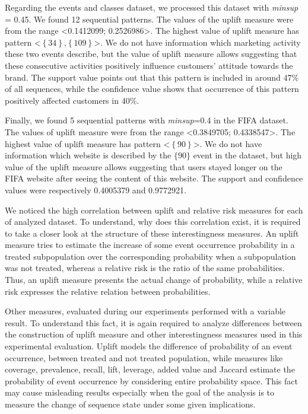 \documentclass[runningheads,a4paper]{llncs}
\begin{document}
Regarding the events and classes dataset, we processed this dataset with \textit{minsup} = 0.45. We found 12 sequential patterns. The values of the uplift measure were from the range \textless 0.1412099; 0.2526986\textgreater. The highest value of uplift measure has pattern \textless$\left\{\text{34}\right\}$,$\left\{\text{109}\right\}$\textgreater. We do not have information which marketing activity these two events describe, but the value of uplift measure allows suggesting that these consecutive activities positively influence customers’ attitude towards the brand. The support value points out that this pattern is included in around 47\% of all sequences, while the confidence value shows that occurrence of this pattern positively affected customers in 40\%.

Finally, we found 5 sequential patterns with \textit{minsup}=0.4 in the FIFA dataset. The values of uplift measure were from the range \textless 0.3849705; 0.4338547\textgreater. The highest value of uplift measure has pattern \textless$\left\{\text{90}\right\}$\textgreater. We do not have information which website is described by the $\{\text{90}\}$ event in the dataset, but high value of the uplift measure allows suggesting that users stayed longer on the FIFA website after seeing the content of this website. The support and confidence values were respectively 0.4005379 and 0.9772921.

We noticed the high correlation between uplift and relative risk measures for each of analyzed dataset. To understand, why does this correlation exist, it is required to take a closer look at the structure of these interestingness measures. An uplift measure tries to estimate the increase of some event occurrence probability in a treated subpopulation over the corresponding probability when a subpopulation was not treated, whereas a relative risk is the ratio of the same probabilities. Thus, an uplift measure presents the actual change of probability, while a relative risk expresses the relative relation between probabilities.

Other measures, evaluated during our experiments performed with a variable result.
To understand this fact, it is again required to analyze differences between the construction of uplift measure and other interestingness measures used in this experimental evaluation.
Uplift models the difference of probability of an event occurrence, between treated and not treated population, while measures like coverage, prevalence, recall, lift, leverage, added value and Jaccard estimate the probability of event occurrence by considering entire probability space.
This fact may cause misleading results especially when the goal of the analysis is to measure the change of sequence state under some given implications.
\end{document}
